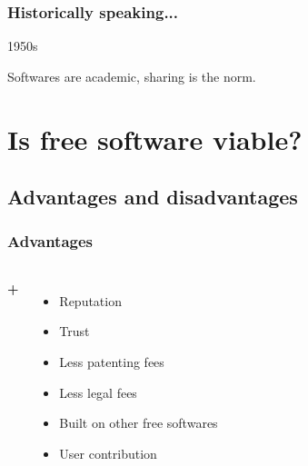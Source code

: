 \documentclass{beamer}
\begin{document}
\begin{frame}

  \frametitle{Historically speaking...}

  \begin{block}{1950s}
    \begin{center}Softwares are academic, sharing is the norm.\end{center}
  \end{block}



\end{frame}

\section{Is free software viable?}

\subsection{Advantages and disadvantages}

\begin{frame}

  \frametitle{Advantages}

  \begin{columns}

    \begin{center}
      \Huge{\textbf{+}}
    \end{center}

    \begin{itemize}
      \item<2->{Reputation}
      \item<3->{Trust}
      \item<4->{Less patenting fees}
      \item<5->{Less legal fees}
      \item<6->{Built on other free softwares}
      \item<7>{User contribution}
    \end{itemize}

  \end{columns}

\end{frame}
\end{document}
